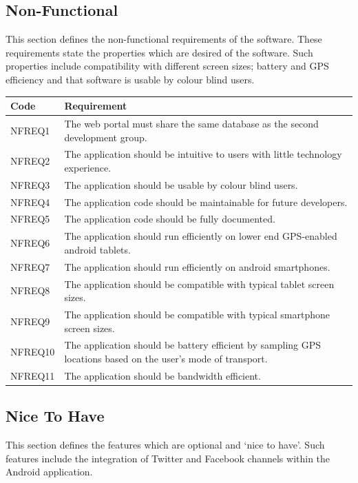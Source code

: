 \documentclass[11pt,a4paper]{article}
\begin{document}
\subsection{Non-Functional}
\label{sec:non-func-reqs}

This section defines the non-functional requirements of the software.
These requirements state the properties which are desired of the software.
Such properties include compatibility with different screen sizes; battery and GPS efficiency and that software is usable by colour blind users.

\begin{longtable}{|p{2.5cm}p{13cm}|}
\hline
\textbf{Code} & \textbf{Requirement} \\

\hline
NFREQ1 & The web portal must share the same database as the second development group. \\ \hline
NFREQ2 & The application should be intuitive to users with little technology experience. \\ \hline
NFREQ3 & The application should be usable by colour blind users. \\ \hline
NFREQ4 & The application code should be maintainable for future developers. \\ \hline
NFREQ5 & The application code should be fully documented. \\ \hline
NFREQ6 & The application should run efficiently on lower end GPS-enabled android tablets. \\ \hline
NFREQ7 & The application should run efficiently on android smartphones. \\ \hline
NFREQ8 & The application should be compatible with typical tablet screen sizes. \\ \hline
NFREQ9 & The application should be compatible with typical smartphone screen sizes. \\ \hline
NFREQ10 & The application should be battery efficient by sampling GPS locations based on the user's mode of transport. \\ \hline
NFREQ11 & The application should be bandwidth efficient. \\ \hline
\end{longtable}

\subsection{Nice To Have}
\label{sec:nice-to-have}

This section defines the features which are optional and `nice to have'.
Such features include the integration of Twitter and Facebook channels within the Android application.
\end{document}
